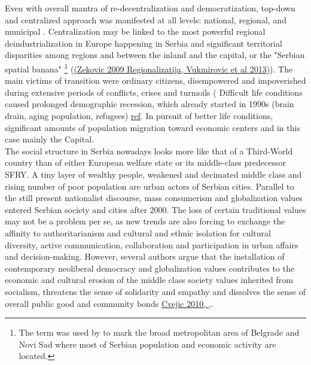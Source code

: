 \documentclass[11pt]{report}
\begin{document}
Even with overall mantra of re-decentralization and democratization, top-down and centralized approach was manifested at all levels: national, regional, and municipal \href{ref}{\citealt{vukmirovic_city_2013}}. Centralization may be linked to the most powerful regional deindustrialization in Europe happening in Serbia and significant territorial disparities among regions and between the inland and the capital, or the "Serbian spatial banana"
\footnote{The term was used by \href{ref}{\citealt{vujosevic_collapse_2010}}
to mark the broad metropolitan area of Belgrade and Novi Sad where most of Serbian population and economic activity are located.} (\href{ref}{(Zekovic 2009 Regionalizatija, Vukmirovic et al 2013)}).
The main victims of transition were ordinary citizens, disempowered and impoverished during extensive periods of conflicts, crises and turmoils (\href{ref}{\citealt{nedovic-budic_mornings_2011}}%
Difficult life conditions caused prolonged demographic recession, which already started in 1990s (brain drain, aging population, refugees) \href{ref}{ref}.
In pursuit of better life conditions, significant amounts of population migration toward economic centers and in this case mainly the Capital\href{ref}{\citealt{vukmirovic_city_2013}}.
\\

The social structure in Serbia nowadays looks more like that of a Third-World country than of either European welfare state or its middle-class predecessor SFRY.
A tiny layer of wealthy people, weakened and decimated middle class and rising number of poor population are urban actors of Serbian cities.
Parallel to the still present nationalist discourse, mass consumerism and globalization values entered Serbian society and cities after 2000.
The loss of certain traditional values may not be a problem per se, as new trends are also forcing to exchange the affinity to authoritarianism and cultural and ethnic isolation for cultural diversity, active communication, collaboration and participation in urban affairs and decision-making.
However, several authors argue that the installation of contemporary neoliberal democracy and globalization values contributes to the economic and cultural erosion of the middle class society values inherited from socialism, threatens the sense of solidarity and empathy and dissolves the sense of overall public good and community bonds \href{ref}{Cvejic 2010, } \href{ref}{\citealt{vukmirovic_city_2013}},\href{ref}{\citealt{ doytchinov_belgrade_2015}}.
\end{document}
